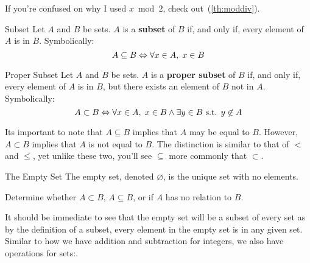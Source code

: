 If you're confused on why I used $x \bmod 2$, check out~(\ref{th:moddiv}).

\begin{definition}{Subset}{}
    Let $A$ and $B$ be sets. $A$ is a \textbf{subset} of $B$ if, and only if, every element of $A$ is in $B$. Symbolically:
    \begin{equation*}
        A \subseteq B \Leftrightarrow \forall x \in A, \hspace{0.1cm} x \in B
    \end{equation*}
\end{definition}

\begin{definition}{Proper Subset}{}
    Let $A$ and $B$ be sets. $A$ is a \textbf{proper subset} of $B$ if, and only if, every element of $A$ is in $B$, but there exists an element of $B$ not in $A$. Symbolically:
    \begin{equation*}
        A \subset B \Leftrightarrow \forall x \in A, \hspace{0.1cm} x \in B \land \exists y \in B \text{ s.t. } y \not\in A
    \end{equation*}
\end{definition}

\begin{note}{}{}
    Its important to note that $A \subseteq B$ implies that $A$ may be equal to $B$. However, $A \subset B$ implies that $A$ is not equal to $B$. The distinction is similar to that of $<$ and $\leq$, yet unlike these two, you'll see $\subseteq$ more commonly that $\subset$.
\end{note}

\begin{definition}{The Empty Set}{}
    The empty set, denoted $\varnothing$, is the unique set with no elements. 
\end{definition}

\begin{question}{}{}
    Determine whether $A \subset B$, $A \subseteq B$, or if $A$ has no relation to $B$.
    \begin{questions}


    \end{questions}
\end{question}

It should be immediate to see that the empty set will be a subset of every set as by the definition of a subset, every element in the empty set is in any given set. \\
Similar to how we have addition and subtraction for integers, we also have operations for sets:. 